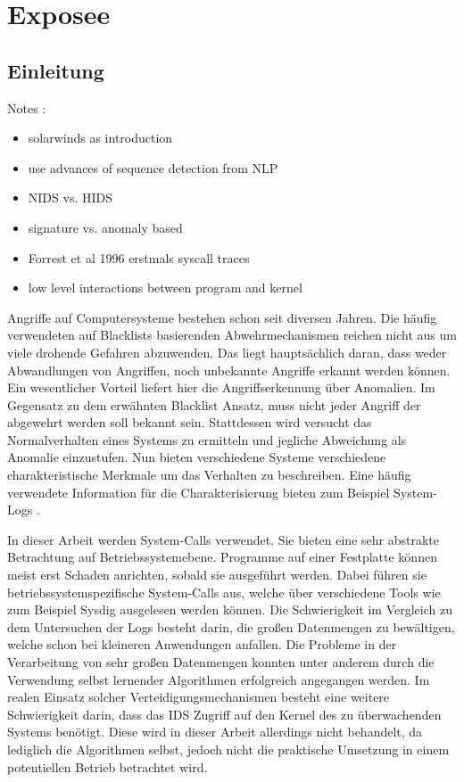 \chapter{Exposee}\label{ch:introduction} %
\section{Einleitung}
Notes :

\begin{itemize}
    \item solarwinds as introduction
    \item use advances of sequence detection from NLP
    \item NIDS vs. HIDS
    \item signature vs. anomaly based
    \item Forrest et al 1996 erstmals syscall traces
    \item low level interactions between program and kernel
\end{itemize}

Angriffe auf Computersysteme bestehen schon seit diversen Jahren. 
Die häufig verwendeten auf Blacklists basierenden Abwehrmechanismen reichen nicht aus um viele drohende Gefahren abzuwenden.
Das liegt hauptsächlich daran, dass weder Abwandlungen von Angriffen, noch unbekannte Angriffe erkannt werden können.
Ein wesentlicher Vorteil liefert hier die Angriffserkennung über Anomalien.
Im Gegensatz zu dem erwähnten Blacklist Ansatz, muss nicht jeder Angriff der abgewehrt werden soll bekannt sein.
Stattdessen wird versucht das Normalverhalten eines Systems zu ermitteln und jegliche Abweichung als Anomalie einzustufen.
Nun bieten verschiedene Systeme verschiedene charakteristische Merkmale um das Verhalten zu beschreiben. 
Eine häufig verwendete Information für die Charakterisierung bieten zum Beispiel System-Logs \cite{HE}.

In dieser Arbeit werden System-Calls verwendet.
Sie bieten eine sehr abstrakte Betrachtung auf Betriebssystemebene.
Programme auf einer Festplatte können meist erst Schaden anrichten, sobald sie ausgeführt werden.
Dabei führen sie betriebssystemspezifische System-Calls aus, welche über verschiedene Tools wie zum Beispiel Sysdig \cite{SYSDIG} ausgelesen werden können.
Die Schwierigkeit im Vergleich zu dem Untersuchen der Logs besteht darin, die großen Datenmengen zu bewältigen, welche schon bei kleineren Anwendungen anfallen.
Die Probleme in der Verarbeitung von sehr großen Datenmengen konnten unter anderem durch die Verwendung selbst lernender Algorithmen erfolgreich angegangen werden.
Im realen Einsatz solcher Verteidigungsmechanismen besteht eine weitere Schwierigkeit darin, dass das IDS Zugriff auf den Kernel des zu überwachenden Systems benötigt.
Diese wird in dieser Arbeit allerdings nicht behandelt, da lediglich die Algorithmen selbst, jedoch nicht die praktische Umsetzung in einem potentiellen Betrieb betrachtet wird.

